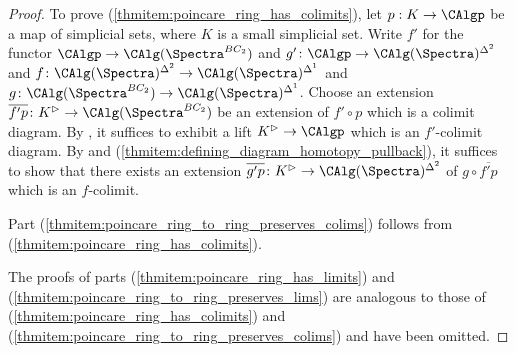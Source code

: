 \begin{proof}
    To prove (\ref{thmitem:poincare_ring_has_colimits}), let $p:K\to \CAlgp$ be a map of simplicial sets, where $K$ is a small simplicial set. 
    Write $ f' $ for the functor $\CAlgp \to \CAlg(\Spectra^{BC_2})$ and $ g'\colon \CAlgp \to  \CAlg(\Spectra)^{\Delta^2} $ and $ f \colon \CAlg(\Spectra)^{\Delta^2} \to  \CAlg(\Spectra)^{\Delta^1} $ and $ g \colon \CAlg(\Spectra^{BC_2}) \to  \CAlg(\Spectra)^{\Delta^1} $. 
    Choose an extension $ \overline{f'p} \colon K^\vartriangleright\to \CAlg(\Spectra^{BC_2}) $ be an extension of $ f'\circ p $ which is a colimit diagram. 
    By \cite[Proposition 4.3.1.5(2)]{HTT}, it suffices to exhibit a lift $ K^\vartriangleright \to \CAlgp $ which is an $ f' $-colimit diagram. 
    By \cite[Prposition 4.3.1.5(4)]{HTT} and (\ref{thmitem:defining_diagram_homotopy_pullback}), it suffices to show that there exists an extension $ \overline{g'p} \colon K^\vartriangleright \to \CAlg(\Spectra)^{\Delta^2} $ of $ g \circ \overline{f'p} $ which is an $ f $-colimit. 

    Part (\ref{thmitem:poincare_ring_to_ring_preserves_colims}) follows from (\ref{thmitem:poincare_ring_has_colimits}). 

    The proofs of parts (\ref{thmitem:poincare_ring_has_limits}) and (\ref{thmitem:poincare_ring_to_ring_preserves_lims}) are analogous to those of (\ref{thmitem:poincare_ring_has_colimits}) and (\ref{thmitem:poincare_ring_to_ring_preserves_colims}) and have been omitted.  
\end{proof}

